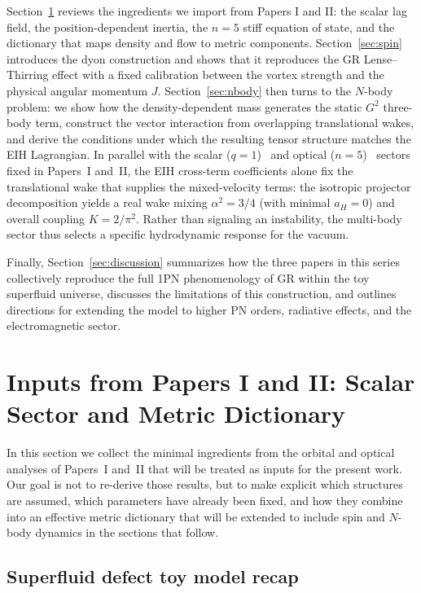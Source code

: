 \documentclass[11pt]{article}
\begin{document}
Section~\ref{sec:inputs} reviews the ingredients we import from Papers I and II:
the scalar lag field, the position-dependent inertia, the $n=5$ stiff equation
of state, and the dictionary that maps density and flow to metric components.
Section~\ref{sec:spin} introduces the dyon construction and shows that it
reproduces the GR Lense--Thirring effect with a fixed calibration between the
vortex strength and the physical angular momentum $J$.
Section~\ref{sec:nbody} then turns to the $N$-body problem: we show how the
density-dependent mass generates the static $G^2$ three-body term, construct
the vector interaction from overlapping translational wakes, and derive the
conditions under which the resulting tensor structure matches the EIH
Lagrangian.
In parallel with the scalar ($q=1$)~\cite{Norris:2025Orbits} and optical ($n=5$)~\cite{Norris:Paper2}
sectors fixed in Papers~I and~II, the EIH cross-term coefficients alone fix the
translational wake that supplies the mixed-velocity terms: the isotropic
projector decomposition yields a real wake mixing $\alpha^2=3/4$ (with minimal
$a_H=0$) and overall coupling $K=2/\pi^2$.
Rather than signaling an instability, the multi-body sector thus selects a
specific hydrodynamic response for the vacuum.

Finally, Section~\ref{sec:discussion} summarizes how the three papers in this
series collectively reproduce the full 1PN phenomenology of GR within the toy
superfluid universe, discusses the limitations of this construction, and
outlines directions for extending the model to higher PN orders, radiative
effects, and the electromagnetic sector.

\section{Inputs from Papers I and II: Scalar Sector and Metric Dictionary}
\label{sec:inputs}

In this section we collect the minimal ingredients from the orbital
and optical analyses of Papers~I and~II that will be treated as inputs
for the present work.
Our goal is not to re-derive those results, but to make explicit
which structures are assumed, which parameters have already been fixed,
and how they combine into an effective metric dictionary that will be
extended to include spin and $N$-body dynamics in the sections that follow.

\subsection{Superfluid defect toy model recap}
\label{subsec:inputs-model}
\end{document}
